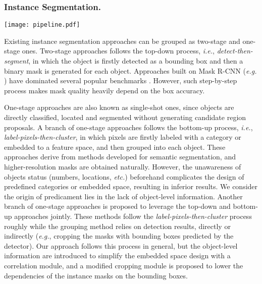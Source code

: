 \documentclass[letterpaper]{article} \usepackage{aaai20}  \usepackage{times}  \usepackage{helvet} \usepackage{courier}  \usepackage[hyphens]{url}  \usepackage{graphicx} \urlstyle{rm} \def\UrlFont{\rm}  \usepackage{graphicx}  \frenchspacing  \setlength{\pdfpagewidth}{8.5in}  \setlength{\pdfpageheight}{11in}
\newcommand{\ie}{\textit{i.e.}}
\begin{document}
\subsubsection{Instance Segmentation.}

\begin{figure*}[ht]
	\centering
	\texttt{[image: pipeline.pdf]}
	\caption{The architecture of the proposed RDSNet, which follows a two-stream structure, \textit{i.e.}, object stream and pixel stream. Information from these two streams are mutually interacted by several well-designed modules: the correlation module and cropping module introduce the awareness of instance and the translation variance to pixel stream, assisting in generating the instance masks (see Sec.~\ref{sec:o2p}). In turn, the instance masks assist the object stream in obtaining more accurate bounding boxes (see Sec.~\ref{sec:p2o}). \textit{c} denotes the class number,  denotes the anchors number at one location,  denotes the representation dimensions, and  denotes the convolution operation.}
	\label{fig:pipeline}
\end{figure*}

Existing instance segmentation approaches can be grouped as two-stage and one-stage ones. Two-stage approaches follows the top-down process, \ie, \textit{detect-then-segment}\cite{he2017mask}, in which the object is firstly detected as a bounding box and then a binary mask is generated for each object. Approaches built on Mask R-CNN (\textit{e.g.} \cite{liu2018path}) have dominated several popular benchmarks \cite{lin2014microsoft,cordts2016cityscapes}. However, such step-by-step process makes mask quality heavily depend on the box accuracy.

One-stage approaches are also known as single-shot ones, since objects are directly classified, located and segmented without generating candidate region proposals. A branch of one-stage approaches  follows the bottom-up process, \ie, \textit{label-pixels-then-cluster}, in which pixels are firstly labeled with a category or embedded to a feature space, and then grouped into each object. These approaches derive from methods developed for semantic segmentation, and higher-resolution masks are obtained naturally. However, the unawareness of objects status (numbers, locations, \textit{etc.}) beforehand complicates the design of predefined categories or embedded space, resulting in inferior results. We consider the origin of predicament lies in the lack of object-level information. Another branch of one-stage approaches \cite{li2017fully,dan2019yolact} is proposed to leverage the top-down and bottom-up approaches jointly. These methods follow the \textit{label-pixels-then-cluster} process roughly while the grouping method relies on detection results, directly or indirectly (\textit{e.g.}, cropping the masks with bounding boxes predicted by the detector). Our approach follows this process in general, but the object-level information are introduced to simplify the embedded space design with a correlation module, and a modified cropping module is proposed to lower the dependencies of the instance masks on the bounding boxes. 
\end{document}
